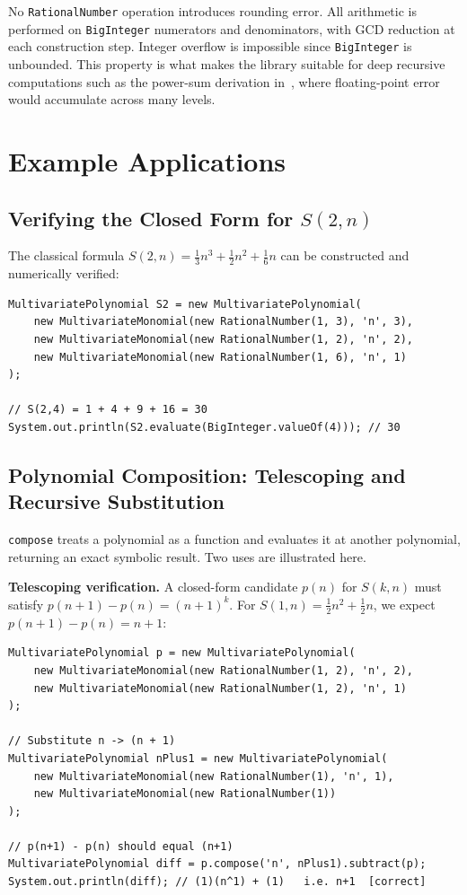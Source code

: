 \documentclass[11pt,a4paper]{article}
\begin{document}
No \texttt{RationalNumber} operation introduces rounding error.
All arithmetic is performed on \texttt{BigInteger} numerators and denominators,
with GCD reduction at each construction step.
Integer overflow is impossible since \texttt{BigInteger} is unbounded.
This property is what makes the library suitable for deep recursive computations
such as the power-sum derivation in~\cite{trinsit2026}, where floating-point
error would accumulate across many levels.

\section{Example Applications}

\subsection{Verifying the Closed Form for $S(2,n)$}

The classical formula
$S(2,n)=\tfrac{1}{3}n^{3}+\tfrac{1}{2}n^{2}+\tfrac{1}{6}n$
can be constructed and numerically verified:

\begin{lstlisting}
MultivariatePolynomial S2 = new MultivariatePolynomial(
    new MultivariateMonomial(new RationalNumber(1, 3), 'n', 3),
    new MultivariateMonomial(new RationalNumber(1, 2), 'n', 2),
    new MultivariateMonomial(new RationalNumber(1, 6), 'n', 1)
);

// S(2,4) = 1 + 4 + 9 + 16 = 30
System.out.println(S2.evaluate(BigInteger.valueOf(4))); // 30
\end{lstlisting}

\subsection{Polynomial Composition: Telescoping and Recursive Substitution}

\texttt{compose} treats a polynomial as a function and evaluates it at
another polynomial, returning an exact symbolic result.
Two uses are illustrated here.

\textbf{Telescoping verification.}
A closed-form candidate $p(n)$ for $S(k,n)$ must satisfy
$p(n+1)-p(n)=(n+1)^{k}$.
For $S(1,n)=\tfrac{1}{2}n^{2}+\tfrac{1}{2}n$, we expect
$p(n+1)-p(n)=n+1$:

\begin{lstlisting}
MultivariatePolynomial p = new MultivariatePolynomial(
    new MultivariateMonomial(new RationalNumber(1, 2), 'n', 2),
    new MultivariateMonomial(new RationalNumber(1, 2), 'n', 1)
);

// Substitute n -> (n + 1)
MultivariatePolynomial nPlus1 = new MultivariatePolynomial(
    new MultivariateMonomial(new RationalNumber(1), 'n', 1),
    new MultivariateMonomial(new RationalNumber(1))
);

// p(n+1) - p(n) should equal (n+1)
MultivariatePolynomial diff = p.compose('n', nPlus1).subtract(p);
System.out.println(diff); // (1)(n^1) + (1)   i.e. n+1  [correct]
\end{lstlisting}
\end{document}
